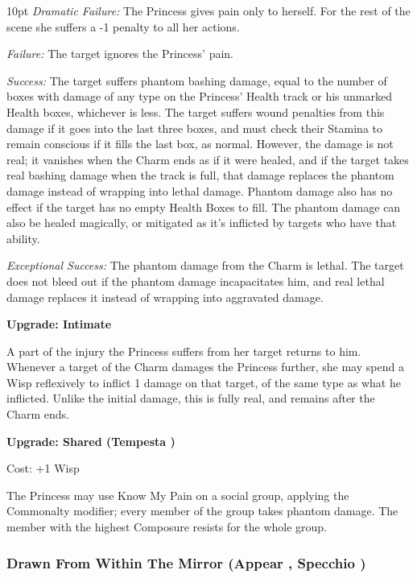 \begin{myindentpar}{10pt}    \emph{Dramatic Failure:} The Princess gives pain only to herself. For the rest of the scene she suffers a -1 penalty to all her actions.

    \emph{Failure:} The target ignores the Princess' pain.

    \emph{Success:} The target suffers phantom bashing damage, equal to the number of boxes with damage of any type on the Princess' Health track or his unmarked Health boxes, whichever is less. The target suffers wound penalties from this damage if it goes into the last three boxes, and must check their Stamina to remain conscious if it fills the last box, as normal. However, the damage is not real; it vanishes when the Charm ends as if it were healed, and if the target takes real bashing damage when the track is full, that damage replaces the phantom damage instead of wrapping into lethal damage. Phantom damage also has no effect if the target has no empty Health Boxes to fill. The phantom damage can also be healed magically, or mitigated as it's inflicted by targets who have that ability.

    \emph{Exceptional Success:} The phantom damage from the Charm is lethal. The target does not bleed out if the phantom damage incapacitates him, and real lethal damage replaces it instead of wrapping into aggravated damage. 

\textbf{Upgrade: Intimate}

A part of the injury the Princess suffers from her target returns to him. Whenever a target of the Charm damages the Princess further, she may spend a Wisp reflexively to inflict 1 damage on that target, of the same type as what he inflicted. Unlike the initial damage, this is fully real, and remains after the Charm ends.

\textbf{Upgrade: Shared (Tempesta \textbullet\textbullet\textbullet)}

\noindent Cost: +1 Wisp

The Princess may use Know My Pain on a social group, applying the Commonalty modifier; every member of the group takes phantom damage. The member with the highest Composure resists for the whole group.

\end{myindentpar}

\subsubsection*{Drawn From Within The Mirror (Appear \textbullet\textbullet\textbullet, Specchio \textbullet\textbullet)}

